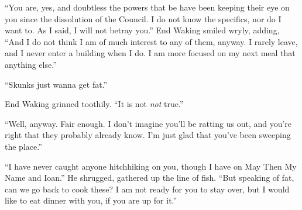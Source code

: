 ``You are, yes, and doubtless the powers that be have been keeping their eye on you since the dissolution of the Council. I do not know the specifics, nor do I want to. As I said, I will not betray you.'' End Waking smiled wryly, adding, ``And I do not think I am of much interest to any of them, anyway. I rarely leave, and I never enter a building when I do. I am more focused on my next meal that anything else.''

``Skunks just wanna get fat.''

End Waking grinned toothily. ``It is not \emph{not} true.''

``Well, anyway. Fair enough. I don't imagine you'll be ratting us out, and you're right that they probably already know. I'm just glad that you've been sweeping the place.''

``I have never caught anyone hitchhiking on you, though I have on May Then My Name and Ioan.'' He shrugged, gathered up the line of fish. ``But speaking of fat, can we go back to cook these? I am not ready for you to stay over, but I would like to eat dinner with you, if you are up for it.''
